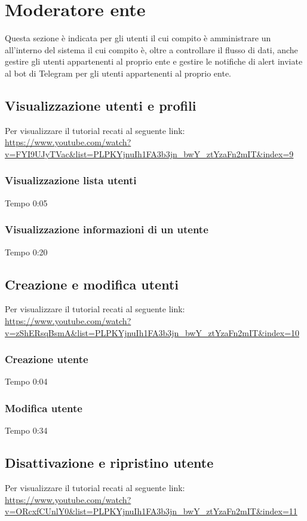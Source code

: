 \section{Moderatore ente}
Questa sezione è indicata per gli utenti il cui compito è amministrare un  all'interno del sistema il cui compito è, oltre a controllare il flusso di dati, anche gestire gli utenti appartenenti al proprio ente e gestire le notifiche di alert inviate al bot di Telegram per gli utenti appartenenti al proprio ente.

\subsection{Visualizzazione utenti e profili}
Per visualizzare il tutorial recati al seguente link: 
\url{https://www.youtube.com/watch?v=FYI9UJyTVac&list=PLPKYjnuIh1FA3b3jn_bwY_ztYzaFn2mIT&index=9}

	\subsubsection{Visualizzazione lista utenti}
	Tempo 0:05

	\subsubsection{Visualizzazione informazioni di un utente}
	Tempo 0:20

\subsection{Creazione e modifica utenti}
Per visualizzare il tutorial recati al seguente link: 
\url{https://www.youtube.com/watch?v=zShERsqBsmA&list=PLPKYjnuIh1FA3b3jn_bwY_ztYzaFn2mIT&index=10}

	\subsubsection{Creazione utente}
	Tempo 0:04

	\subsubsection{Modifica utente}
	Tempo 0:34


\subsection{Disattivazione e ripristino utente}
Per visualizzare il tutorial recati al seguente link: 
\url{https://www.youtube.com/watch?v=ORcxfCUnlY0&list=PLPKYjnuIh1FA3b3jn_bwY_ztYzaFn2mIT&index=11}

